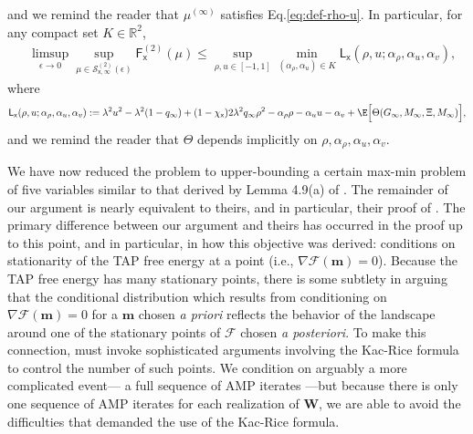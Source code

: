 \documentclass[]{article}
\def\sx{{\mathsf x}}
\def\bW{{\boldsymbol W}}
\def\cF{{\mathcal F}}
\def\reals{{\mathbb R}}
\def\bW{{\boldsymbol W}}
\def\cF{{\mathcal F}}
\def\cS{{\mathcal S}}
\def\bbm{{\boldsymbol m}}
\def\cS{{\mathcal S}}
\def\sF{\mathsf{F}}
\def\sL{\mathsf{L}}
\begin{document}
and we remind the reader that $\mu^{(\infty)}$ satisfies Eq.\eqref{eq:def-rho-u}.
In particular, 
for any compact set $K \in \reals^2 $,
\begin{equation}
\label{eq:wass-to-scalar}
\begin{aligned}
    &\limsup_{\epsilon \rightarrow 0}
        \sup_{\mu \in \cS^{(2)}_{\sx,\infty}(\epsilon)} \sF_{\sx}^{(2)}(\mu)
        \leq
        \sup_{\rho,u \in [-1,1]}
        \min_{(\alpha_\rho,\alpha_u) \in K}
        \sL_{\sx}(\rho,u;\alpha_\rho,\alpha_u,\alpha_v),
\end{aligned}
\end{equation}
where
\begin{equation}
    \sL_{\sx}(\rho,u;\alpha_\rho,\alpha_u,\alpha_v)
    :=
    \lambda^2u^2 - \lambda^2(1-q_\infty) + (1-\chi_{\sx})2\lambda^2 q_\infty \rho^2 - \alpha_\rho \rho - \alpha_u u - \alpha_v
        +
        \E\Big[\Theta(G_\infty,M_\infty,\Xi,M_{\infty})\Big],
\end{equation}
and we remind the reader that $\Theta$ depends implicitly on $\rho,\alpha_\rho,\alpha_u,\alpha_v$.

We have now reduced the problem to upper-bounding a certain max-min problem of five variables similar to that derived by Lemma 4.9(a) of \cite{celentanoFanMei2021}. 
The remainder of our argument is nearly equivalent to theirs,
and in particular, their proof of \cite[Lemma 4.9(b)]{celentanoFanMei2021}.
The primary difference between our argument and theirs has occurred in the proof up to this point,
and in particular, in how this objective was derived:
\cite{celentanoFanMei2021} conditions on stationarity of the TAP free energy at a point (i.e., $\nabla \cF(\bbm) = 0$).
Because the TAP free energy has many stationary points,
there is some subtlety in arguing that the conditional distribution which results from conditioning on $\nabla \cF(\bbm) = 0$ for a $\bbm$ chosen \emph{a priori} reflects the behavior of the landscape around one of the stationary points of $\cF$ chosen \emph{a posteriori}.
To make this connection,
\cite{celentanoFanMei2021} must invoke sophisticated arguments involving the Kac-Rice formula to control the number of such points.
We condition on arguably a more complicated event--- a full sequence of AMP iterates ---but because there is only one sequence of AMP iterates for each realization of $\bW$, 
we are able to avoid the difficulties that demanded the use of the Kac-Rice formula.
\end{document}
